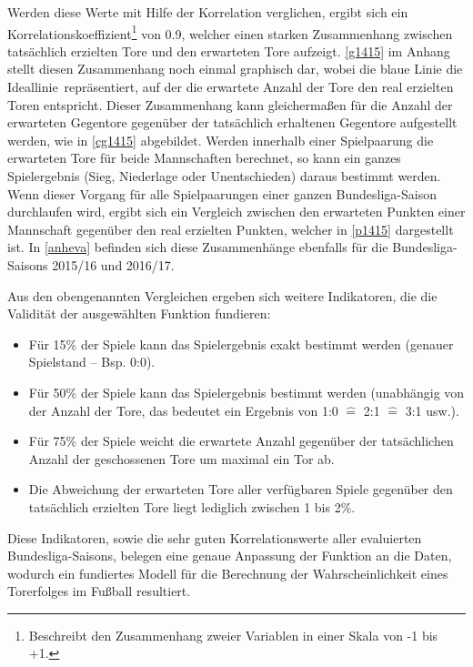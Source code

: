 Werden diese Werte mit Hilfe der Korrelation verglichen, ergibt sich ein Korrelationskoeffizient\footnote{Beschreibt den Zusammenhang zweier Variablen in einer Skala von -1 bis +1.} von \textsf{0.9}, welcher einen starken Zusammenhang zwischen tatsächlich erzielten Tore und den erwarteten Tore aufzeigt. \vref{g1415} im Anhang stellt diesen Zusammenhang noch einmal graphisch dar, wobei die blaue Linie die \glqq Ideallinie\grqq~repräsentiert, auf der die erwartete Anzahl der Tore den real erzielten Toren entspricht. Dieser Zusammenhang kann gleichermaßen für die Anzahl der erwarteten Gegentore gegenüber der tatsächlich erhaltenen Gegentore aufgestellt werden, wie in \vref{cg1415} abgebildet. Werden innerhalb einer Spielpaarung die erwarteten Tore für beide Mannschaften berechnet, so kann ein ganzes Spielergebnis (Sieg, Niederlage oder Unentschieden) daraus bestimmt werden. Wenn dieser Vorgang für alle Spielpaarungen einer ganzen Bundesliga-Saison durchlaufen wird, ergibt sich ein Vergleich zwischen den erwarteten Punkten einer Mannschaft gegenüber den real erzielten Punkten, welcher in \vref{p1415} dargestellt ist. In \vref{anheva} befinden sich diese Zusammenhänge ebenfalls für die Bundesliga-Saisons 2015/16 und 2016/17.

Aus den obengenannten Vergleichen ergeben sich weitere Indikatoren, die die Validität der ausgewählten Funktion fundieren:

\begin{itemize}
\item Für \textsf{15\%} der Spiele kann das Spielergebnis exakt bestimmt werden (genauer Spielstand – Bsp.  \textsf{0:0}).
\item Für  \textsf{50\%} der Spiele kann das Spielergebnis bestimmt werden (unabhängig von der Anzahl der Tore, das bedeutet ein Ergebnis von \textsf{1:0 $\hat{=}$ 2:1 $\hat{=}$ 3:1} usw.).
\item Für \textsf{75\%} der Spiele weicht die erwartete Anzahl gegenüber der tatsächlichen Anzahl der geschossenen Tore um maximal ein Tor ab.
\item Die Abweichung der erwarteten Tore aller verfügbaren Spiele gegenüber den tatsächlich erzielten Tore liegt lediglich zwischen \textsf{1} bis \textsf{2\%}.
\end{itemize}

Diese Indikatoren, sowie die sehr guten Korrelationswerte aller evaluierten Bundesliga-Saisons, belegen eine genaue Anpassung der Funktion an die Daten, wodurch ein fundiertes Modell für die Berechnung der Wahrscheinlichkeit eines Torerfolges im Fußball resultiert.